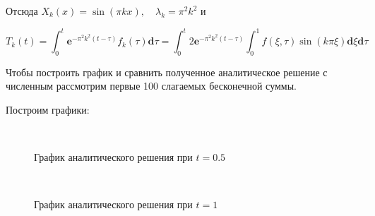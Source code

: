 \documentclass[14pt,a4paper]{scrartcl}
\begin{document}
Отсюда $X_k(x) = \sin(\pi k x), \quad \lambda_k = \pi^2 k^2$ и 

\begin{equation*}
	T_k(t) = \int_{0}^{t}\mathbf{e}^{-\pi^2k^2(t-\tau)} f_k(\tau)\mathbf{d}\tau = \int_{0}^{t}2\mathbf{e}^{-\pi^2k^2(t-\tau)} \int_{0}^{1}f(\xi,\tau)\sin(k \pi \xi) \mathbf{d}\xi \mathbf{d}\tau
\end{equation*}


Чтобы построить график и сравнить полученное аналитическое решение с численным рассмотрим первые 100 слагаемых бесконечной суммы.

Построим графики:

\begin{figure}[H]
	\begin{minipage}[h]{1\linewidth}
		\\
		\caption{График аналитического решения при $t=0.5$}
	\end{minipage}
\end{figure}


\begin{figure}[H]
	\begin{minipage}[h]{1\linewidth}
		\\
		\caption{График аналитического решения при $t=1$}
	\end{minipage}
\end{figure}
\end{document}
